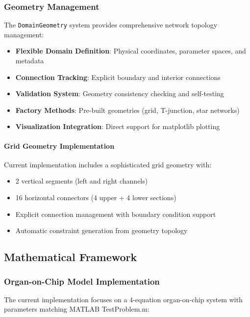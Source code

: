 \subsubsection{Geometry Management}

The \texttt{DomainGeometry} system provides comprehensive network topology management:

\begin{itemize}
    \item \textbf{Flexible Domain Definition}: Physical coordinates, parameter spaces, and metadata
    \item \textbf{Connection Tracking}: Explicit boundary and interior connections
    \item \textbf{Validation System}: Geometry consistency checking and self-testing
    \item \textbf{Factory Methods}: Pre-built geometries (grid, T-junction, star networks)
    \item \textbf{Visualization Integration}: Direct support for matplotlib plotting
\end{itemize}

\paragraph{Grid Geometry Implementation}
Current implementation includes a sophisticated grid geometry with:
\begin{itemize}
    \item 2 vertical segments (left and right channels)
    \item 16 horizontal connectors (4 upper + 4 lower sections)
    \item Explicit connection management with boundary condition support
    \item Automatic constraint generation from geometry topology
\end{itemize}

\subsection{Mathematical Framework}

\subsubsection{Organ-on-Chip Model Implementation}

The current implementation focuses on a 4-equation organ-on-chip system with parameters matching MATLAB TestProblem.m:

